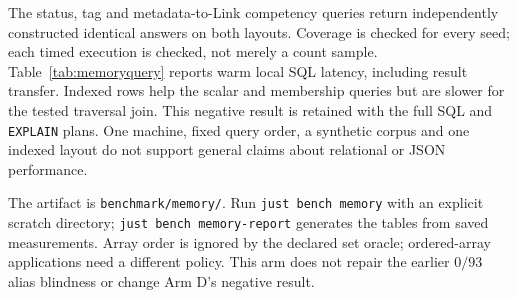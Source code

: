 The status, tag and metadata-to-Link competency queries return independently
constructed identical answers on both layouts. Coverage is checked for every
seed; each timed execution is checked, not merely a count sample. Table~\ref{tab:memoryquery}
reports warm local SQL latency, including result transfer. Indexed rows help
the scalar and membership queries but are slower for the tested traversal join.
This negative result is retained with the full SQL and \texttt{EXPLAIN} plans.
One machine, fixed query order, a synthetic corpus and one indexed layout do not
support general claims about relational or JSON performance.

The artifact is \texttt{benchmark/memory/}. Run \texttt{just bench memory}
with an explicit scratch directory; \texttt{just bench memory-report} generates
the tables from saved measurements. Array order is ignored by the declared set
oracle; ordered-array applications need a different policy. This arm does not
repair the earlier $0/93$ alias blindness or change Arm D's negative result.
